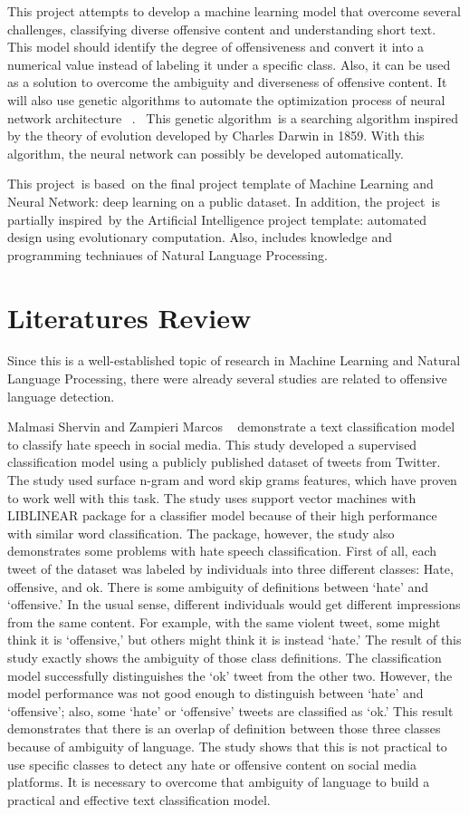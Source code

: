 \documentclass[11pt, natbib=false]{article}
\begin{document}
This project attempts to develop a machine learning model that overcome several challenges, classifying diverse offensive content and understanding short text.
This model should identify the degree of offensiveness and convert it into a numerical value instead of labeling it under a specific class.
Also, it can be used as a solution to overcome the ambiguity and diverseness of offensive content.
It will also use genetic algorithms to automate the optimization process of neural network architecture ~\cite{andersen2021evolving}. 
This genetic algorithm is a searching algorithm inspired by the theory of evolution developed by Charles Darwin in 1859.
With this algorithm, the neural network can possibly be developed automatically.

This project is based on the final project template of Machine Learning and Neural Network: deep learning on a public dataset.
In addition, the project is partially inspired by the Artificial Intelligence project template: automated design using evolutionary computation.
Also, includes knowledge and programming techniaues of Natural Language Processing. 

\section{Literatures Review}
Since this is a well-established topic of research in Machine Learning and Natural Language Processing, there were already several studies are related to offensive language detection. 

Malmasi Shervin and Zampieri Marcos ~\cite{malmasi2017detecting} demonstrate a text classification model to classify hate speech in social media. This study developed a supervised classification model using a publicly published dataset of tweets from Twitter.
The study used surface n-gram and word skip grams features, which have proven to work well with this task. The study uses support vector machines with LIBLINEAR package for a classifier model because of their high performance with similar word classification.
The package, however, the study also demonstrates some problems with hate speech classification. First of all, each tweet of the dataset was labeled by individuals into three different classes: Hate, offensive, and ok.
There is some ambiguity of definitions between ‘hate’ and ‘offensive.’ In the usual sense, different individuals would get different impressions from the same content.
For example, with the same violent tweet, some might think it is ‘offensive,’ but others might think it is instead ‘hate.’
The result of this study exactly shows the ambiguity of those class definitions. The classification model successfully distinguishes the ‘ok’ tweet from the other two. However, the model performance was not good enough to distinguish between ‘hate’ and ‘offensive’; also, some ‘hate’ or ‘offensive’ tweets are classified as ‘ok.’
This result demonstrates that there is an overlap of definition between those three classes because of ambiguity of language.
The study shows that this is not practical to use specific classes to detect any hate or offensive content on social media platforms.
It is necessary to overcome that ambiguity of language to build a practical and effective text classification model. 
\end{document}
